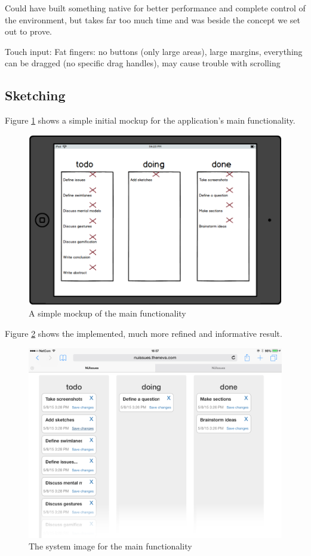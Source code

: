 Could have built something native for better performance and complete control of the environment, but takes far too much time and was beside the concept we set out to prove.

Touch input: Fat fingers: no buttons (only large areas), large margins, everything can be dragged (no specific drag handles), may cause trouble with scrolling

\subsection{Sketching}

Figure \ref{figure:ipad-mockup} shows a simple initial mockup for the application's main functionality.

\begin{figure}[H]
    \centerline{\includegraphics[scale=0.4]{images/mockup}}
    \caption{A simple mockup of the main functionality}   
    \label{figure:ipad-mockup}
\end{figure}

Figure \ref{figure:ipad-default-simple-screenshots} shows the implemented, much more refined and informative result.

\begin{figure}[H]
    \centerline{\includegraphics[scale=0.4]{images/nuissues-screenshots/01-default-all-swimlanes}}
    \caption{The system image for the main functionality}
    \label{figure:ipad-default-simple-screenshots}  
\end{figure}

